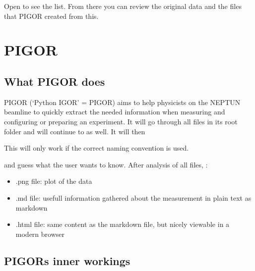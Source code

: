 \documentclass[letterpaper,10pt,english]{sphinxmanual}
\begin{document}
Open  to see the list. From there you can review the original data and the files that PIGOR created from this.


\chapter{PIGOR}
\label{\detokenize{pigor:pigor}}\label{\detokenize{pigor::doc}}

\section{What PIGOR does}
\label{\detokenize{pigor:what-pigor-does}}
PIGOR (‘Python IGOR’ = PIGOR) aims to help physicists on the NEPTUN beamline to quickly extract the needed information when measuring and configuring or preparing an experiment. It will go through all files in its root folder and will continue to  as well. It will then  %
\begin{footnote}[1]\sphinxAtStartFootnote
This will only work if the correct naming convention is used.
%
\end{footnote}  and guess what the user wants to know. After analysis of all files, :
\begin{itemize}
\item {} 
.png file: plot of the data

\item {} 
.md file: usefull information gathered about the measurement in plain text as markdown

\item {} 
.html file: same content as the markdown file, but nicely viewable in a modern browser

\end{itemize}


\section{PIGORs inner workings}
\label{\detokenize{pigor:module-pigor}}\label{\detokenize{pigor:pigors-inner-workings}}
\end{document}
